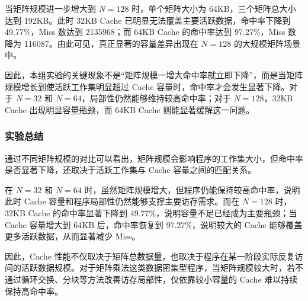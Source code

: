 当矩阵规模进一步增大到 $N=128$ 时，单个矩阵大小为 64KB，三个矩阵总大小达到 192KB。此时 32KB Cache 已明显无法覆盖主要活跃数据，命中率下降到 49.77\%，Miss 数达到 2135968；而 64KB Cache 的命中率达到 97.27\%，Miss 数降为 116087。由此可见，真正显著的容量差异出现在 $N=128$ 的大规模矩阵场景中。

因此，本组实验的关键现象不是“矩阵规模一增大命中率就立即下降”，而是当矩阵规模增长到使活跃工作集明显超过 Cache 容量时，命中率才会发生显著下降。对于 $N=32$ 和 $N=64$，局部性仍然能够维持较高命中率；对于 $N=128$，32KB Cache 出现明显容量瓶颈，而 64KB Cache 则能显著缓解这一问题。

\subsubsection{实验总结}

通过不同矩阵规模的对比可以看出，矩阵规模会影响程序的工作集大小，但命中率是否显著下降，还取决于活跃工作集与 Cache 容量之间的匹配关系。

在 $N=32$ 和 $N=64$ 时，虽然矩阵规模增大，但程序仍能保持较高命中率，说明此时 Cache 容量和程序局部性仍然能够支撑主要访存需求。而在 $N=128$ 时，32KB Cache 的命中率显著下降到 49.77\%，说明容量不足已经成为主要瓶颈；当 Cache 容量增大到 64KB 后，命中率恢复到 97.27\%，说明较大的 Cache 能够覆盖更多活跃数据，从而显著减少 Miss。

因此，Cache 性能不仅取决于矩阵总数据量，也取决于程序在某一阶段实际反复访问的活跃数据规模。对于矩阵乘法这类数据密集型程序，当矩阵规模较大时，若不通过循环交换、分块等方法改善访存局部性，仅依靠较小容量的 Cache 难以持续保持高命中率。